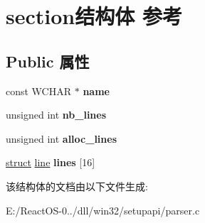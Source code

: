 \hypertarget{structsection}{}\section{section结构体 参考}
\label{structsection}
\subsection*{Public 属性}
\begin{DoxyCompactItemize}
\item 
\mbox{\label{structsection_a005fa0a09289e51e2b42851e542b07e3}} 
const W\+C\+H\+AR $\ast$ {\bfseries name}
\item 
\mbox{\label{structsection_a84a9fc815abfca809a11ec0fba0d1a17}} 
unsigned int {\bfseries nb\+\_\+lines}
\item 
\mbox{\label{structsection_a5adceda4efb93416e5c90e88b36e0bad}} 
unsigned int {\bfseries alloc\+\_\+lines}
\item 
\mbox{\label{structsection_ab06769bd37cb03afc9883e17d92292dc}} 
\hyperlink{interfacestruct}{struct} \hyperlink{structline}{line} {\bfseries lines} \mbox{[}16\mbox{]}
\end{DoxyCompactItemize}


该结构体的文档由以下文件生成\+:\begin{DoxyCompactItemize}
\item 
E\+:/\+React\+O\+S-\/0../dll/win32/setupapi/parser.\+c\end{DoxyCompactItemize}
